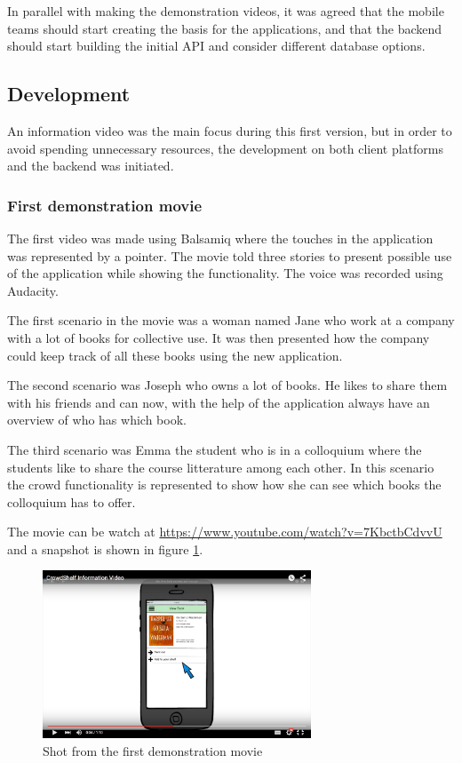 In parallel with making the demonstration videos, it was agreed that the mobile teams should start creating the basis for the applications, and that the backend should start building the initial \gls{API} and consider different database options.


\subsection{Development}
An information video was the main focus during this first version, but in order to avoid spending unnecessary resources, the development on both client platforms and the backend was initiated.

\subsubsection{First demonstration movie} 
The first video was made using Balsamiq \cite{balsamiq} where the touches in the application was represented by a pointer. The movie told three stories to present possible use of the application while showing the functionality. The voice was recorded using Audacity. 

The first scenario in the movie was a woman named Jane who work at a company with a lot of books for collective use. It was then presented how the company could keep track of all these books using the new application.

The second scenario was Joseph who owns a lot of books. He likes to share them with his friends and can now, with the help of the application always have an overview of who has which book. 

The third scenario was Emma the student who is in a colloquium where the students like to share the course litterature among each other. In this scenario the crowd functionality is represented to show how she can see which books the colloquium has to offer.

The movie can be watch at \url{https://www.youtube.com/watch?v=7KbctbCdvvU} and a snapshot is shown in figure \ref{fig:information-film-01}.
\begin{figure}
\centering
\includegraphics[height=5cm]{figs/v01/FirstInformationMovieBook.png}
\caption{Shot from the first demonstration movie}
\label{fig:information-film-01}
\end{figure}

